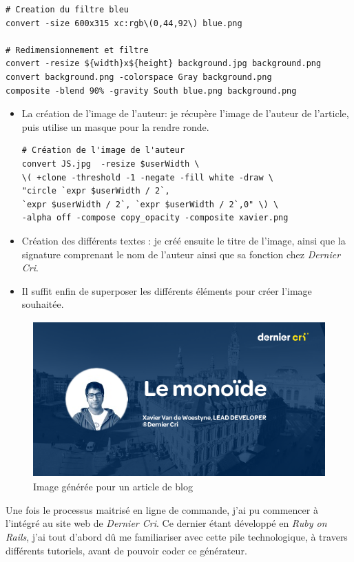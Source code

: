 \begin{verbatim}
# Creation du filtre bleu
convert -size 600x315 xc:rgb\(0,44,92\) blue.png

# Redimensionnement et filtre
convert -resize ${width}x${height} background.jpg background.png
convert background.png -colorspace Gray background.png
composite -blend 90% -gravity South blue.png background.png
\end{verbatim}

\begin{itemize}
\item
  La création de l'image de l'auteur: je récupère l'image de l'auteur de
  l'article, puis utilise un masque pour la rendre ronde.

\begin{verbatim}
# Création de l'image de l'auteur
convert JS.jpg  -resize $userWidth \
\( +clone -threshold -1 -negate -fill white -draw \
"circle `expr $userWidth / 2`,
`expr $userWidth / 2`, `expr $userWidth / 2`,0" \) \
-alpha off -compose copy_opacity -composite xavier.png
\end{verbatim}
\item
  Création des différents textes : je créé ensuite le titre de l'image,
  ainsi que la signature comprenant le nom de l'auteur ainsi que sa
  fonction chez \emph{Dernier Cri}.
\item
  Il suffit enfin de superposer les différents éléments pour créer
  l'image souhaitée.
\end{itemize}

\begin{figure}[h]
  \centering
  \includegraphics[height=6cm]{figures/blog.png}
  \caption{Image générée pour un article de blog}
\end{figure}

\bigskip

Une fois le processus maitrisé en ligne de commande, j'ai pu commencer à
l'intégré au site web de \emph{Dernier Cri}. Ce dernier étant développé
en \emph{Ruby on Rails}, j'ai tout d'abord dû me familiariser avec cette
pile technologique, à travers différents tutoriels, avant de pouvoir
coder ce générateur.

